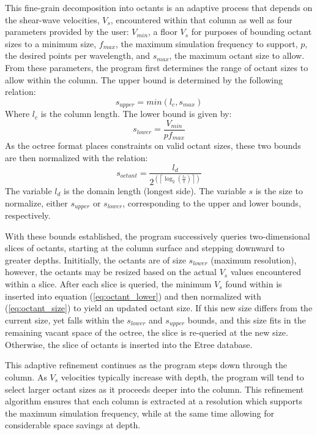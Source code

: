 This fine-grain decomposition into octants is an adaptive process that depends on the shear-wave velocities, $V_s$, encountered within that column as well as four parameters provided by the user: $V_{min}$, a floor $V_s$ for purposes of bounding octant sizes to a minimum size, $f_{max}$, the maximum simulation frequency to support, $p$, the desired points per wavelength, and $s_{max}$, the maximum octant size to allow. From these parameters, the program first determines the range of octant sizes to allow within the column. The upper bound is determined by the following relation:
\begin{equation}\label{eq:octant_upper}
s_{upper} = min(l_c, s_{max})
\end{equation}
Where $l_c$ is the column length. The lower bound is given by:
\begin{equation}\label{eq:octant_lower}
s_{lower} = \frac{V_{min}}{p f_{max}}
\end{equation}
As the octree format places constraints on valid octant sizes, these two bounds are then normalized with the relation:
\begin{equation}\label{eq:octant_size}
s_{octant} = \frac{l_{d}}{ 2^{\left( \left\lceil \log_{2}(\frac{l_{d}}{s}) \right\rceil \right)} }
\end{equation}
The variable $l_{d}$ is the domain length (longest side). The variable $s$ is the size to normalize, either $s_{upper}$ or $s_{lower}$, corresponding to the upper and lower bounds, respectively.

With these bounds established, the program successively queries two-dimensional slices of octants, starting at the column surface and stepping downward to greater depths. Inititially, the octants are of size $s_{lower}$ (maximum resolution), however, the octants may be resized based on the actual $V_s$ values encountered within a slice. After each slice is queried, the minimum $V_s$ found within is inserted into equation (\ref{eq:octant_lower}) and then normalized with (\ref{eq:octant_size}) to yield an updated octant size. If this new size differs from the current size, yet falls within the $s_{lower}$ and $s_{upper}$ bounds, and this size fits in the remaining vacant space of the octree, the slice is re-queried at the new size. Otherwise, the slice of octants is inserted into the Etree database.

This adaptive refinement continues as the program steps down through the column. As $V_s$ velocities typically increase with depth, the program will tend to select larger octant sizes as it proceeds deeper into the column. This refinement algorithm ensures that each column is extracted at a resolution which supports the maximum simulation frequency, while at the same time allowing for considerable space savings at depth.

